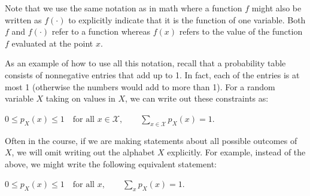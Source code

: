 \documentclass[6008notes.tex]{subfiles}
\begin{document}
Note that we use the same notation as in math where a function $f$ might also be written as $f(\cdot )$ to explicitly indicate that it is the function of one variable. Both $f$ and $f(\cdot )$ refer to a function whereas $f(x)$ refers to the value of the function $f$ evaluated at the point $x$.

As an example of how to use all this notation, recall that a probability table consists of nonnegative entries that add up to 1. In fact, each of the entries is at most 1 (otherwise the numbers would add to more than 1). For a random variable $X$ taking on values in $X$, we can write out these constraints as:

$0 \le p_ X(x) \le 1\quad \text {for all }x\in \mathcal{X}, \qquad \sum _{x \in \mathcal{X}} p_ X(x) = 1.$
 
Often in the course, if we are making statements about all possible outcomes of $X$, we will omit writing out the alphabet $X$ explicitly. For example, instead of the above, we might write the following equivalent statement:

$0 \le p_ X(x) \le 1\quad \text {for all }x, \qquad \sum _ x p_ X(x) = 1.$
\end{document}
